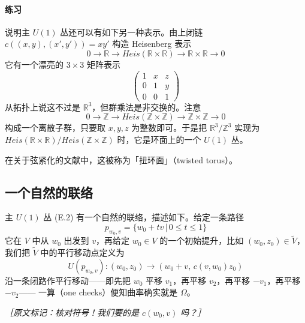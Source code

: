 \paragraph{练习}
说明主 $U(1)$ 丛还可以有如下另一种表示。由上闭链 $c((x,y),(x',y'))=xy'$ 构造 Heisenberg 表示
\begin{equation}
  0\to\mathbb{R}\to Heis(\mathbb{R}\times\mathbb{R})\to\mathbb{R}\times\mathbb{R}\to 0
  \tag{E.11}
  \label{eq:E.11}
\end{equation}
它有一个漂亮的 $3\times 3$ 矩阵表示
\begin{equation}
  \begin{pmatrix} 1 & x & z\\ 0 & 1 & y\\ 0 & 0 & 1\end{pmatrix}
  \tag{E.12}
  \label{eq:E.12}
\end{equation}
从拓扑上说这不过是 $\mathbb{R}^3$，但群乘法是非交换的。注意
\begin{equation}
  0\to\mathbb{Z}\to Heis(\mathbb{Z}\times\mathbb{Z})\to\mathbb{Z}\times\mathbb{Z}\to 0
  \tag{E.13}
  \label{eq:E.13}
\end{equation}
构成一个离散子群，只要取 $x,y,z$ 为整数即可。于是把 $\mathbb{R}^3/\mathbb{Z}^3$ 实现为
$Heis(\mathbb{R}\times\mathbb{R})/Heis(\mathbb{Z}\times\mathbb{Z})$ 时，它是环面上的一个 $U(1)$ 丛。

在关于弦紧化的文献中，这被称为「扭环面」（twisted torus）。

\subsection{一个自然的联络} %

主 $U(1)$ 丛 (E.2) 有一个自然的联络，描述如下。给定一条路径
\begin{equation}
  p_{w_0,v} = \{w_0+tv\,|\,0\le t\le 1\}
  \tag{E.14}
  \label{eq:E.14}
\end{equation}
它在 $V$ 中从 $w_0$ 出发到 $v$，再给定 $w_0\in V$ 的一个初始提升，比如
$(w_0,z_0)\in\tilde V$，我们把 $\tilde V$ 中的平行移动点定义为
\begin{equation}
  U(p_{w_0,v}):(w_0,z_0)\to(w_0+v,\,c(v,w_0)z_0)
  \tag{E.15}
  \label{eq:E.15}
\end{equation}
沿一条闭路作平行移动——即先把 $w_0$ 平移 $v_1$，再平移 $v_2$，再平移 $-v_1$，再平移 $-v_2$——
一算（one checks）便知曲率确实就是 $\Omega$。

{\small\itshape ［原文标记：核对符号！我们要的是 $c(w_0,v)$ 吗？］}

